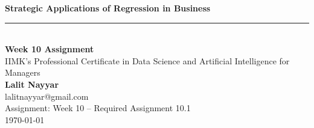\documentclass[12pt]{article}
\begin{document}
\begin{titlepage}
    \centering
    {\huge\bfseries Strategic Applications of Regression in Business\\[1.5ex]}
    \vspace{1cm}
    \rule{\linewidth}{0.5mm} \\
    \vspace{1cm}
    {\large\bfseries Week 10 Assignment}\\[1ex]
    {\large IIMK's Professional Certificate in Data Science and Artificial Intelligence for Managers}\\[2ex]
    {\large\bfseries Lalit Nayyar}\\[1ex]
    {\large lalitnayyar@gmail.com}\\[2ex]
    {\large Assignment: Week 10 – Required Assignment 10.1}\\[2ex]
    \vfill
    {\large \today}
    \vspace*{1cm}
\end{titlepage}

\tableofcontents
\newpage

\end{document}
